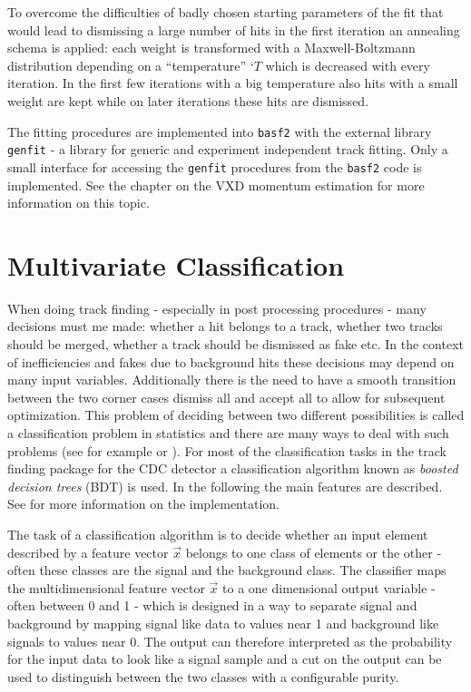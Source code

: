 To overcome the difficulties of badly chosen starting parameters of the fit that would lead to dismissing a large number of hits in the first iteration an annealing schema is applied: each weight is transformed with a Maxwell-Boltzmann distribution depending on a ``temperature'' `$T$ which is decreased with every iteration. In the first few iterations with a big temperature also hits with a small weight are kept while on later iterations these hits are dismissed.

The fitting procedures are implemented into \texttt{basf2} with the external library \texttt{genfit} \cite{genfit} - a library for generic and experiment independent track fitting. Only a small interface for accessing the \texttt{genfit} procedures from the \texttt{basf2} code is implemented. See the chapter on the VXD momentum estimation for more information on this topic.

\section{Multivariate Classification}

When doing track finding - especially in post processing procedures - many decisions must me made: whether a hit belongs to a track, whether two tracks should be merged, whether a track should be dismissed as fake etc. In the context of inefficiencies and fakes due to background hits these decisions may depend on many input variables. Additionally there is the need to have a smooth transition between the two corner cases dismiss all and accept all to allow for subsequent optimization. This problem of deciding between two different possibilities is called a classification problem in statistics and there are many ways to deal with such problems (see for example \cite{cowan} or \cite{blobel}). For most of the classification tasks in the track finding package for the CDC detector a classification algorithm known as \emph{boosted decision trees} (BDT) is used. In the following the main features are described. See \cite{keck} for more information on the implementation.

The task of a classification algorithm is to decide whether an input element described by a feature vector $\vec x$ belongs to one class of elements or the other - often these classes are the signal and the background class. The classifier maps the multidimensional feature vector $\vec x$ to a one dimensional output variable - often between 0 and 1 - which is designed in a way to separate signal and background by mapping signal like data to values near 1 and background like signals to values near 0. The output can therefore interpreted as the probability for the input data to look like a signal sample and a cut on the output can be used to distinguish between the two classes with a configurable purity.

